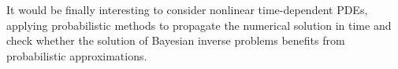 \documentclass{siamart1116}
\begin{document}
It would be finally interesting to consider nonlinear time-dependent PDEs, applying probabilistic methods to propagate the numerical solution in time and check whether the solution of Bayesian inverse problems benefits from probabilistic approximations.



	
		
\end{document}
